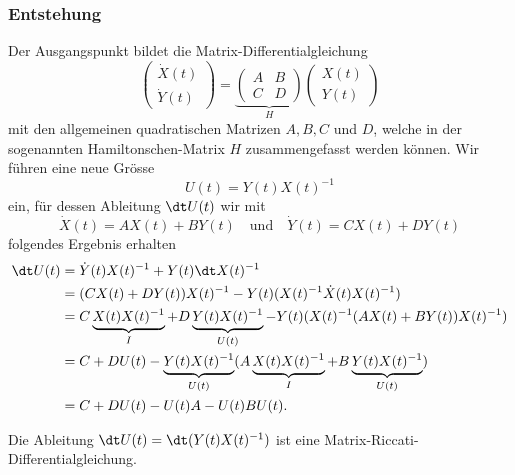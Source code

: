 \subsubsection{Entstehung}
Der Ausgangspunkt bildet die Matrix-Differentialgleichung
\begin{equation}
    \label{kra:equation:matrix-dgl}
    \begin{pmatrix}
        \dot{X}(t) \\
        \dot{Y}(t)
    \end{pmatrix}
    =
    \underbrace{
        \begin{pmatrix}
            A & B \\
            C & D
        \end{pmatrix}
    }_{\displaystyle{H}}
    \begin{pmatrix}
        X(t) \\
        Y(t)
    \end{pmatrix}
\end{equation}
mit den allgemeinen quadratischen Matrizen $A, B, C$ und $D$, welche in der sogenannten Hamiltonschen-Matrix $H$ zusammengefasst werden können.
Wir führen eine neue Grösse
\[
    U(t) = Y(t)X(t)^{-1}
\]
ein, für dessen Ableitung $\dt U(t)$ wir mit
\[
    \dot{X}(t) = AX(t) + BY(t) \quad \text{und} \quad \dot{Y}(t) = CX(t) + DY(t)
\]
folgendes Ergebnis erhalten
\begin{equation}
    \label{kra:equation:feder-masse-riccati-matrix}
    \begin{split}
        \dt U(t)   &= \dot{Y}(t) X(t)^{-1} + Y(t) \dt X(t)^{-1} \\
        &= (CX(t) + DY(t)) X(t)^{-1} - Y(t) (X(t)^{-1} \dot{X}(t) X(t)^{-1}) \\
        &= C\underbrace{X(t)X(t)^{-1}}_\text{$I$} + D\underbrace{Y(t)X(t)^{-1}}_\text{$U(t)$} - Y(t)(X(t)^{-1} (AX(t) + BY(t)) X(t)^{-1}) \\
        &= C + DU(t) - \underbrace{Y(t)X(t)^{-1}}_\text{$U(t)$}(A\underbrace{X(t)X(t)^{-1}}_\text{$I$} + B\underbrace{Y(t)X(t)^{-1}}_\text{$U(t)$}) \\
        &= C  + DU(t) - U(t)A - U(t)BU(t).
    \end{split}
\end{equation}
\begin{satz}
    \label{kra:satz:riccati-matrix-dgl}
    Die Ableitung $\dt U(t) = \dt (Y(t)X(t)^{-1})$ ist eine Matrix-Riccati-Differentialgleichung.
\end{satz}

